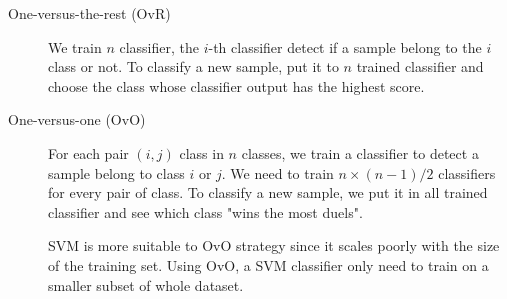 \begin{description}

	\item[One-versus-the-rest (OvR)]
	
	We train $n$ classifier, the $i$-th classifier detect if a sample belong to the $i$ class or not. To classify a new sample, put it to $n$ trained classifier and choose the class whose classifier output has the highest score.
	
	\item[One-versus-one (OvO)]
	
	For each pair $(i, j)$ class in $n$ classes, we train a classifier to detect a sample belong to class $i$ or $j$. We need to train $n \times (n - 1) / 2$ classifiers for every pair of class. To classify a new sample, we put it in all trained classifier and see which class "wins the most duels".
	
	SVM is more suitable to OvO strategy since it scales poorly with the size of the training set. Using OvO, a SVM classifier only need to train on a smaller subset of whole dataset.

\end{description}
